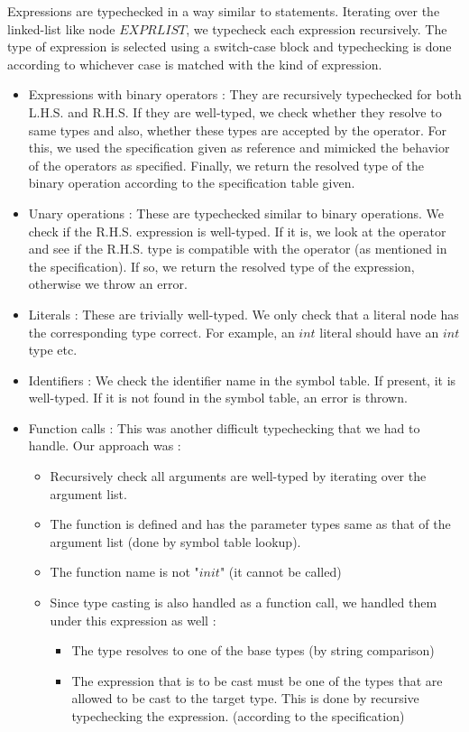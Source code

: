 \documentclass[preprint,12pt]{elsarticle}
\begin{document}
Expressions are typechecked in a way similar to statements. Iterating over the linked-list like node $EXPRLIST$, we typecheck each expression recursively. The type of expression is selected using a switch-case block and typechecking is done according to whichever case is matched with the kind of expression.
\begin{itemize}
\item Expressions with binary operators : They are recursively typechecked for both L.H.S. and R.H.S. If they are well-typed, we check whether they resolve to same types and also, whether these types are accepted by the operator. For this, we used the specification given as reference and mimicked the behavior of the operators as specified. Finally, we return the resolved type of the binary operation according to the specification table given.
\item Unary operations : These are typechecked similar to binary operations. We check if the R.H.S. expression is well-typed. If it is, we look at the operator and see if the R.H.S. type is compatible with the operator (as mentioned in the specification). If so, we return the resolved type of the expression, otherwise we throw an error.
\item Literals : These are trivially well-typed. We only check that a literal node has the corresponding type correct. For example, an $int$ literal should have an $int$ type etc.
\item Identifiers : We check the identifier name in the symbol table. If present, it is well-typed. If it is not found in the symbol table, an error is thrown. 
\item Function calls : This was another difficult typechecking that we had to handle. Our approach was :
\begin{itemize}
\item Recursively check all arguments are well-typed by iterating over the argument list.
\item The function is defined and has the parameter types same as that of the argument list (done by symbol table lookup).
\item The function name is not "$init$" (it cannot be called)
\item Since type casting is also handled as a function call, we handled them under this expression as well :  
\begin{itemize}
\item The type resolves to one of the base types (by string comparison)
\item The expression that is to be cast must be one of the types that are allowed to be cast to the target type. This is done by recursive typechecking the expression. (according to the specification)

\end{itemize}
\end{itemize}
\end{itemize}
\end{document}

